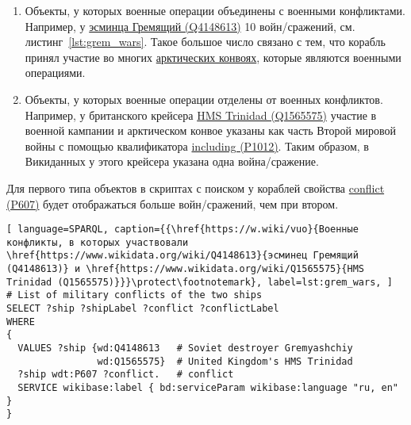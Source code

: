 \begin{enumerate}
  \item Объекты, у которых военные операции объединены с военными конфликтами. Например, у \href{https://www.wikidata.org/wiki/Q4148613}{эсминца Гремящий (Q4148613)} 10 войн/сражений, см. листинг~\ref{lst:grem_wars}. Такое большое число связано с тем, что корабль принял участие во многих \href{https://ru.wikipedia.org/wiki/Арктические_конвои}{арктических конвоях}, которые являются военными операциями.
  \item Объекты, у которых военные операции отделены от военных конфликтов. Например, у британского крейсера \href{https://www.wikidata.org/wiki/Q1565575}{HMS Trinidad (Q1565575)} участие в военной кампании и арктическом конвое указаны как часть Второй мировой войны с помощью квалификатора \href{https://www.wikidata.org/wiki/Property:P1012}{including (P1012)}. Таким образом, в Викиданных у этого крейсера указана одна война/сражение.
\end{enumerate}

Для первого типа объектов в скриптах с поиском у кораблей свойства \href{https://www.wikidata.org/wiki/Property:P607}{conflict (P607)} будет отображаться больше войн/сражений, чем при втором. 

\label{question:ship_3}


\begin{lstlisting}[ language=SPARQL, caption={{\href{https://w.wiki/vuo}{Военные конфликты, в которых участвовали \href{https://www.wikidata.org/wiki/Q4148613}{эсминец Гремящий (Q4148613)} и \href{https://www.wikidata.org/wiki/Q1565575}{HMS Trinidad (Q1565575)}}}\protect\footnotemark}, label=lst:grem_wars, ]
# List of military conflicts of the two ships 
SELECT ?ship ?shipLabel ?conflict ?conflictLabel
WHERE
{
  VALUES ?ship {wd:Q4148613   # Soviet destroyer Gremyashchiy
                wd:Q1565575}  # United Kingdom's HMS Trinidad
  ?ship wdt:P607 ?conflict.   # conflict
  SERVICE wikibase:label { bd:serviceParam wikibase:language "ru, en" }
}
\end{lstlisting}

